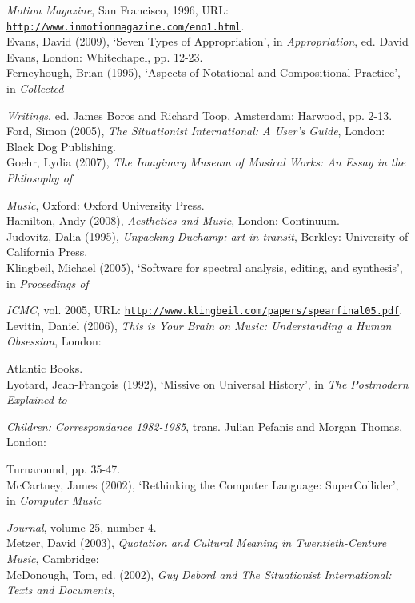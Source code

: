 \emph{Motion Magazine}, San Francisco, 1996, URL: \href{http://www.inmotionmagazine.com/eno1.html}{\texttt {http://www.inmotionmagazine.com/eno1.html}}.
\hypertarget{evans}{}\\
Evans, David (2009), `Seven Types of Appropriation', in \emph{Appropriation}, ed. David Evans, London: Whitechapel, pp. 12-23.
\hypertarget{ferneyhough}{}\\
Ferneyhough, Brian (1995), `Aspects of Notational and Compositional Practice', in \emph{Collected}

\emph{Writings}, ed. James Boros and Richard Toop, Amsterdam: Harwood, pp. 2-13.
\hypertarget{ford}{}\\
Ford, Simon (2005), \emph{The Situationist International: A User's Guide}, London: Black Dog Publishing.
\hypertarget{goer}{}\\
Goehr, Lydia (2007), \emph{The Imaginary Museum of Musical Works: An Essay in the Philosophy of}

\emph{Music}, Oxford: Oxford University Press.
\hypertarget{hamilton}{}\\
Hamilton, Andy (2008), \emph{Aesthetics and Music}, London: Continuum. 
\hypertarget{judovitz}{}\\
Judovitz, Dalia (1995), \emph{Unpacking Duchamp: art in transit}, Berkley: University of California Press. 
\hypertarget{klingbeil}{}\\
Klingbeil, Michael (2005), `Software for spectral analysis, editing, and synthesis', in \emph{Proceedings of}

\emph{ICMC}, vol. 2005, URL: \href{http://www.klingbeil.com/papers/spearfinal05.pdf}{\texttt{http://www.klingbeil.com/papers/spearfinal05.pdf}}.
\hypertarget{musmind}{} \\ 
Levitin, Daniel (2006), \emph{This is Your Brain on Music: Understanding a Human Obsession}, London: 

Atlantic Books. 
\hypertarget{lyotard}{}\\
Lyotard, Jean-Fran\c{c}ois (1992), `Missive on Universal History', in \emph{The Postmodern Explained to}

\emph{Children:} \emph{Correspondance 1982-1985}, trans. Julian Pefanis and Morgan Thomas, London: 

Turnaround, pp. 35-47. 
\hypertarget{mccartney}{}\\
McCartney, James (2002), `Rethinking the Computer Language: SuperCollider', in \emph{Computer Music} 

\emph{Journal}, volume 25, number 4.
\hypertarget{mcdonough}{}\\
Metzer, David (2003), \emph{Quotation and Cultural Meaning in Twentieth-Centure Music}, Cambridge: 
\hypertarget{metzer}{}\\
McDonough, Tom, ed. (2002), \emph{Guy Debord and The Situationist International: Texts and Documents}, 

